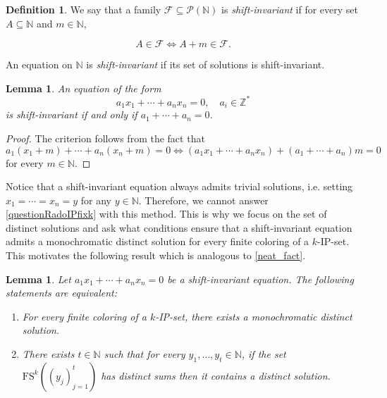 \documentclass{article}
\theoremstyle{definition}
\newtheorem{definition}{Definition}[section]
\theoremstyle{plain}
\newtheorem{lemma}[theorem]{Lemma}
\theoremstyle{remark}
\newcommand{\N}{\ensuremath{\mathbb{N}}}
\newcommand{\Z}{\ensuremath{\mathbb{Z}}}
\newcommand{\FF}{\ensuremath{\mathcal{F}}}
\newcommand{\PP}{\ensuremath{\mathcal{P}}}
\newcommand{\FS}[2][]{\ensuremath{\mathrm{FS}^{#1}\left(#2\right)}}
\begin{document}
\begin{definition}
    We say that  a family $\FF \subseteq \PP(\N)$ is \textit{shift-invariant} if for every set $A \subseteq \N$ and $m \in \N$,
    
    $$A \in \FF \iff A + m \in \FF.$$

    An equation on $\N$ is \textit{shift-invariant} if its set of solutions is shift-invariant.
\end{definition}
\begin{lemma}\label{shift_invariance_condition}
    An equation of the form $$a_1 x_1 + \cdots + a_n x_n = 0, \quad a_i \in \Z^*$$
    is shift-invariant if and only if $a_1 + \cdots + a_n = 0$.
\end{lemma}
\begin{proof}
    The criterion follows from the fact that
    $$a_1 (x_1 + m) + \cdots + a_n (x_n + m) = 0 \iff (a_1 x_1 + \cdots + a_n x_n)  + (a_1 + \cdots + a_n)m= 0$$
    for every $m \in \N$.
\end{proof}

Notice that a shift-invariant equation always admits trivial solutions, i.e. setting $x_1= \cdots = x_n = y$ for any $y \in \N$. Therefore, we cannot answer \cref{questionRadoIPfixk} with this method. This is why we focus on the set of distinct solutions and ask what conditions ensure that a shift-invariant equation admits a monochromatic distinct solution for every finite coloring of a $k$-IP-set. This motivates the following result which is analogous to \cref{neat_fact}.

\begin{lemma}\label{pseudo_neat_fact}
    Let $a_1 x_1 + \cdots + a_n x_n = 0$ be a shift-invariant equation. The following statements are equivalent:
    \begin{enumerate}
        \item For every finite coloring of a $k$-IP-set, there exists a monochromatic distinct solution.
        \item There exists $t \in \N$ such that for every $y_1, \ldots ,y_t\in \N$, if the set $\FS[k]{(y_j)_{j=1}^t}$ has distinct sums then it contains a distinct solution.
    \end{enumerate}

\end{lemma}
\end{document}
